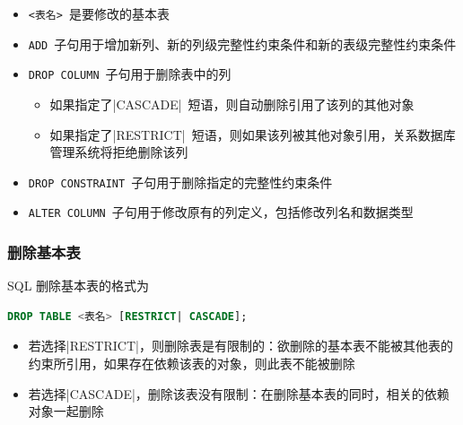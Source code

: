 \begin{itemize}
    \item \verb|<表名>|\ 是要修改的基本表
    \item \verb|ADD|\ 子句用于增加新列、新的列级完整性约束条件和新的表级完整性约束条件
    \item \verb|DROP COLUMN|\ 子句用于删除表中的列
    \begin{itemize}
        \item 如果指定了\sverb|CASCADE|\ 短语，则自动删除引用了该列的其他对象
        \item 如果指定了\sverb|RESTRICT|\ 短语，则如果该列被其他对象引用，关系数据库管理系统将拒绝删除该列
    \end{itemize}
    \item  \verb|DROP CONSTRAINT|\ 子句用于删除指定的完整性约束条件
    \item  \verb|ALTER COLUMN|\ 子句用于修改原有的列定义，包括修改列名和数据类型
\end{itemize}

\subsubsection{删除基本表}
SQL 删除基本表的格式为
\begin{lstlisting}[language=sql]
DROP TABLE <表名> [RESTRICT| CASCADE];
\end{lstlisting}
\begin{itemize}
    \item 若选择\sverb|RESTRICT|，则删除表是有限制的：欲删除的基本表不能被其他表的约束所引用，如果存在依赖该表的对象，则此表不能被删除
    \item 若选择\sverb|CASCADE|，删除该表没有限制：在删除基本表的同时，相关的依赖对象一起删除 
\end{itemize}

